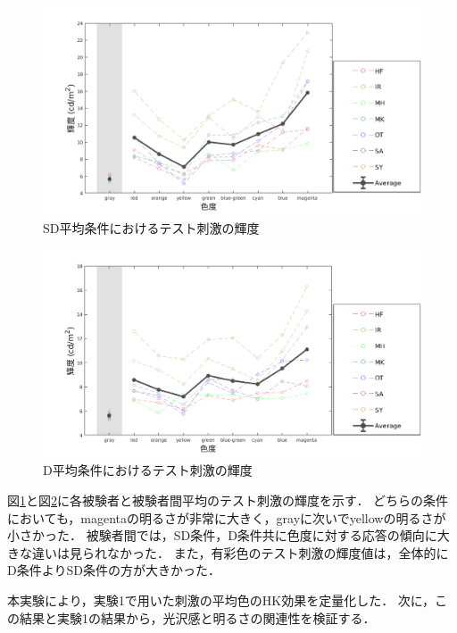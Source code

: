             \begin{figure}[h]
                \centering
                \includegraphics[width=14.0cm]{./img/ex2_res_SD_p.png}
                \caption{SD平均条件におけるテスト刺激の輝度}
                \label{ex2_SD}
            \end{figure}

            \begin{figure}[h]
                \centering
                \includegraphics[width=14.0cm]{./img/ex2_res_D_p.png}
                \caption{D平均条件におけるテスト刺激の輝度}
                \label{ex2_D}
            \end{figure}


            図\ref{ex2_SD}と図\ref{ex2_D}に各被験者と被験者間平均のテスト刺激の輝度を示す．
            どちらの条件においても，magentaの明るさが非常に大きく，grayに次いでyellowの明るさが小さかった．
            被験者間では，SD条件，D条件共に色度に対する応答の傾向に大きな違いは見られなかった．
            また，有彩色のテスト刺激の輝度値は，全体的にD条件よりSD条件の方が大きかった．

            本実験により，実験1で用いた刺激の平均色のHK効果を定量化した．
            次に，この結果と実験1の結果から，光沢感と明るさの関連性を検証する．

